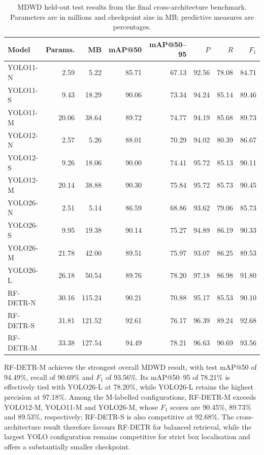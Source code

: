 \begin{table}[htbp]
\centering
\small
\caption{\gls{MDWD} held-out test results from the final cross-architecture benchmark. Parameters are in millions and checkpoint size in MB; predictive measures are percentages.}
\label{tab:ev-mdwd-benchmark}
\renewcommand{\arraystretch}{1.15}
\begin{tabularx}{\textwidth}{@{}>{\raggedright\arraybackslash}Xrrrrrrr@{}}
\toprule
Model & Params. & MB & \gls{mAP}@50 & \gls{mAP}@50--95 & $P$ & $R$ & $F_1$ \\
\midrule
YOLO11-N & 2.59 & 5.22 & 85.71 & 67.13 & 92.56 & 78.08 & 84.71 \\
YOLO11-S & 9.43 & 18.29 & 90.06 & 73.34 & 94.24 & 85.14 & 89.46 \\
YOLO11-M & 20.06 & 38.64 & 89.72 & 74.77 & 94.19 & 85.68 & 89.73 \\
YOLO12-N & 2.57 & 5.26 & 88.01 & 70.29 & 94.02 & 80.39 & 86.67 \\
YOLO12-S & 9.26 & 18.06 & 90.00 & 74.41 & 95.72 & 85.13 & 90.11 \\
YOLO12-M & 20.14 & 38.88 & 90.30 & 75.84 & 95.72 & 85.73 & 90.45 \\
YOLO26-N & 2.51 & 5.14 & 86.59 & 68.86 & 93.62 & 79.06 & 85.73 \\
YOLO26-S & 9.95 & 19.38 & 90.14 & 75.27 & 94.89 & 86.19 & 90.33 \\
YOLO26-M & 21.78 & 42.00 & 89.51 & 75.97 & 93.07 & 86.25 & 89.53 \\
YOLO26-L & 26.18 & 50.54 & 89.76 & 78.20 & 97.18 & 86.98 & 91.80 \\
RF-DETR-N & 30.16 & 115.24 & 90.21 & 70.88 & 95.17 & 85.53 & 90.10 \\
RF-DETR-S & 31.81 & 121.52 & 92.61 & 76.17 & 96.39 & 89.24 & 92.68 \\
RF-DETR-M & 33.38 & 127.54 & 94.49 & 78.21 & 96.63 & 90.69 & 93.56 \\
\bottomrule
\end{tabularx}
\end{table}


RF-DETR-M achieves the strongest overall MDWD result, with test \gls{mAP}@50 of 94.49\%, recall of 90.69\% and \(F_1\) of 93.56\%. Its \gls{mAP}@50--95 of 78.21\% is effectively tied with YOLO26-L at 78.20\%, while YOLO26-L retains the highest precision at 97.18\%. Among the M-labelled configurations, RF-DETR-M exceeds YOLO12-M, YOLO11-M and YOLO26-M, whose \(F_1\) scores are 90.45\%, 89.73\% and 89.53\%, respectively; RF-DETR-S is also competitive at 92.68\%. The cross-architecture result therefore favours RF-DETR for balanced retrieval, while the largest YOLO configuration remains competitive for strict box localisation and offers a substantially smaller checkpoint.

